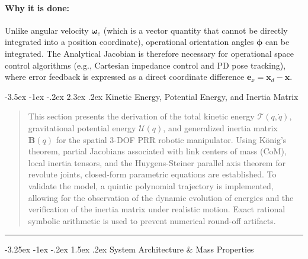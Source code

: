 \documentclass[11pt, a4paper]{article}
\makeatletter
\renewcommand{\section}{\@startsection{section}{1}{\z@}%
    {-3.5ex \@plus -1ex \@minus -.2ex}%
    {2.3ex \@plus .2ex}%
    {\normalfont\Large\bfseries\color{brandblue}}}
\renewcommand{\subsection}{\@startsection{subsection}{2}{\z@}%
    {-3.25ex \@plus -1ex \@minus -.2ex}%
    {1.5ex \@plus .2ex}%
    {\normalfont\large\bfseries\color{brandaccent}}}
\makeatother
\begin{document}
\paragraph{Why it is done:}
Unlike angular velocity $\boldsymbol{\omega}_e$ (which is a vector quantity that cannot be directly integrated into a position coordinate), operational orientation angles $\boldsymbol{\phi}$ can be integrated. The Analytical Jacobian is therefore necessary for operational space control algorithms (e.g., Cartesian impedance control and PD pose tracking), where error feedback is expressed as a direct coordinate difference $\mathbf{e}_x = \mathbf{x}_d - \mathbf{x}$.

\newpage

\section{Kinetic Energy, Potential Energy, and Inertia Matrix}
\label{sec:kinetic-potential-inertia}

\begin{abstract}
\noindent
This section presents the derivation of the total kinetic energy $\mathcal{T}(q, \dot{q})$, gravitational potential energy $\mathcal{U}(q)$, and generalized inertia matrix $\mathbf{B}(q)$ for the spatial 3-DOF PRR robotic manipulator. Using König's theorem, partial Jacobians associated with link centers of mass (CoM), local inertia tensors, and the Huygens-Steiner parallel axis theorem for revolute joints, closed-form parametric equations are established. To validate the model, a quintic polynomial trajectory is implemented, allowing for the observation of the dynamic evolution of energies and the verification of the inertia matrix under realistic motion. Exact rational symbolic arithmetic is used to prevent numerical round-off artifacts.
\end{abstract}

\hrule
\vspace{1.5em}

\subsection{System Architecture \& Mass Properties}
\end{document}

